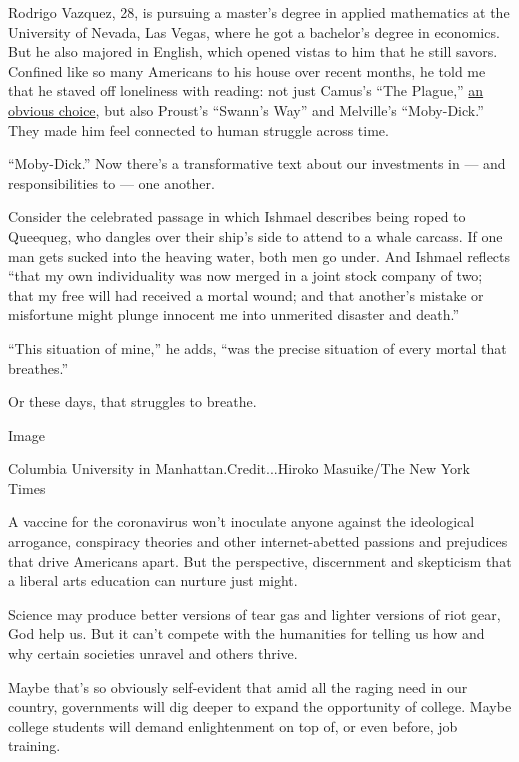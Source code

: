 Rodrigo Vazquez, 28, is pursuing a master's degree in applied
mathematics at the University of Nevada, Las Vegas, where he got a
bachelor's degree in economics. But he also majored in English, which
opened vistas to him that he still savors. Confined like so many
Americans to his house over recent months, he told me that he staved off
loneliness with reading: not just Camus's ``The Plague,''
\href{https://www.theguardian.com/books/2020/mar/05/publishers-report-sales-boom-in-novels-about-fictional-epidemics-camus-the-plague-dean-koontz}{an
obvious choice}, but also Proust's ``Swann's Way'' and Melville's
``Moby-Dick.'' They made him feel connected to human struggle across
time.

``Moby-Dick.'' Now there's a transformative text about our investments
in --- and responsibilities to --- one another.

Consider the celebrated passage in which Ishmael describes being roped
to Queequeg, who dangles over their ship's side to attend to a whale
carcass. If one man gets sucked into the heaving water, both men go
under. And Ishmael reflects ``that my own individuality was now merged
in a joint stock company of two; that my free will had received a mortal
wound; and that another's mistake or misfortune might plunge innocent me
into unmerited disaster and death.''

``This situation of mine,'' he adds, ``was the precise situation of
every mortal that breathes.''

Or these days, that struggles to breathe.

Image

Columbia University in Manhattan.Credit...Hiroko Masuike/The New York
Times

A vaccine for the coronavirus won't inoculate anyone against the
ideological arrogance, conspiracy theories and other internet-abetted
passions and prejudices that drive Americans apart. But the perspective,
discernment and skepticism that a liberal arts education can nurture
just might.

Science may produce better versions of tear gas and lighter versions of
riot gear, God help us. But it can't compete with the humanities for
telling us how and why certain societies unravel and others thrive.

Maybe that's so obviously self-evident that amid all the raging need in
our country, governments will dig deeper to expand the opportunity of
college. Maybe college students will demand enlightenment on top of, or
even before, job training.


